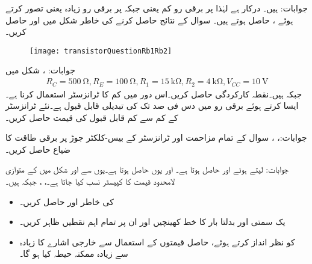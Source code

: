 جوابات: ہیں۔  درکار ہے لہٰذا  پر برقی رو  کم یعنی  جبکہ  پر برقی رو  زیادہ یعنی  تصور کرتے ہوئے ،  حاصل ہوتے ہیں۔
سوال  کے نتائج حاصل کرنے کی خاطر شکل  میں  اور  حاصل کریں۔
\begin{figure}
\centering
\texttt{[image: transistorQuestionRb1Rb2]}
\caption{}
\label{شکل_سوال_ٹرانزسٹر_دور_ب}
\end{figure}

جوابات: ، 
شکل  میں
\begin{align*}
R_C=\SI{500}{\ohm}, R_E=\SI{100}{\ohm}, R_1=\SI{15}{\kilo \ohm},R_2=\SI{4}{\kilo \ohm}, V_{CC}=\SI{10}{\volt}
\end{align*}
جبکہ  ہیں۔نقطہ کارکردگی حاصل کریں۔اس دور میں کم   کا ٹرانزسٹر استعمال کرنا ہے۔ایسا کرتے ہوئے برقی رو میں دس فی صد تک کی تبدیلی قابل قبول ہے۔نئے ٹرانزسٹر کے کم سے کم قابل قبول  کی قیمت حاصل کریں۔

جوابات:، ، 
سوال  کے تمام مزاحمت اور ٹرانزسٹر کے بیس-کلکٹر جوڑ پر برقی طاقت کا ضیاع حاصل کریں۔

جوابات: لیتے ہوئے  اور  حاصل ہوتا ہے۔ اور یوں  حاصل ہوتا ہے۔یوں  سے  اور 
 
شکل   میں  کے متوازی لامحدود قیمت کا کپیسٹر نسب کیا جاتا ہے۔، ،  جبکہ  ہیں۔
\begin{itemize}
\item
{} کی خاطر  اور  حاصل کریں۔
\item
یک سمتی اور بدلتا بار کا خط کھینچیں اور ان پر تمام اہم نقطیں  ظاہر کریں۔
\item
{} کو نظر انداز کرتے ہوئے، حاصل قیمتوں کے استعمال سے خارجی اشارے کا زیادہ سے زیادہ ممکنہ حیطہ کیا ہو گا۔
\end{itemize}

